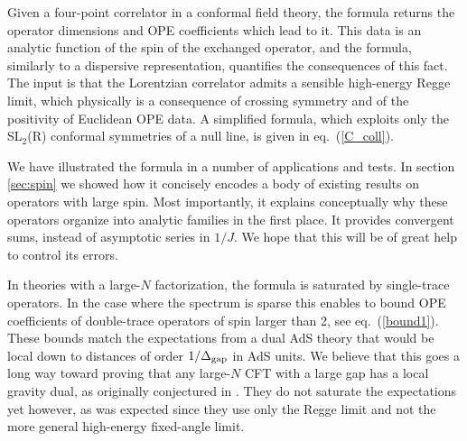 \documentclass[11pt, reqno,preprint]{article}
\def\j{J}
\begin{document}
Given a four-point correlator in a conformal field theory, the formula returns the operator dimensions and
OPE coefficients which lead to it. This data is an analytic function of the spin of the exchanged operator,
and the formula, similarly to a dispersive representation, quantifies the consequences of this fact.
The input is that the Lorentzian correlator admits a sensible high-energy Regge limit,
which physically is a consequence of crossing symmetry and of the positivity of Euclidean OPE data.
A simplified formula, which exploits only the SL${}_2$(R) conformal symmetries of a null line,
is given in eq.~(\ref{C_coll}).

We have illustrated the formula in a number of applications and tests.  In section \ref{sec:spin}
we showed how it concisely encodes a body of existing results on  operators with large spin.
Most importantly, it explains conceptually why these operators organize into analytic families in the first place.
It provides convergent sums, instead of asymptotic series in $1/\j$. We hope that this will be of great help
to control its errors.

In theories with a large-$N$ factorization, the formula is saturated by single-trace operators.
In the case where the spectrum is sparse this enables to bound OPE coefficients
of double-trace operators of spin larger than 2, see eq.~(\ref{bound1}).
These bounds match the expectations from a dual AdS theory that would be local down to distances of order $1/\Delta_{\rm gap}$ in AdS units.
We believe that this goes a long way toward proving that any large-$N$ CFT with a large gap has a local gravity dual,
as originally conjectured in \cite{Heemskerk:2009pn}.
They do not saturate the expectations yet however, as
was expected since they use only the Regge limit and not the more general high-energy fixed-angle limit.
\end{document}
